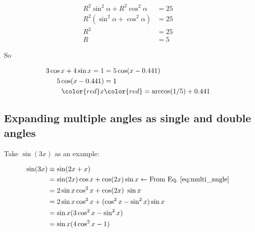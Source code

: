 \begin{equation*}
    \begin{aligned}
    R^2\sin^2\alpha + R^2\cos^2\alpha &= 25\\
    R^2(\sin^2\alpha + \cos^2\alpha) &= 25\\
    R^2 &= 25\\
    R &= 5
    \end{aligned}
\end{equation*}

\noindent{}So

\begin{equation*}
    \begin{aligned}
        3\cos x + 4\sin x = 1 &= 5\cos (x - 0.441)\\
        5\cos(x - 0.441) &= 1\\
        \color{red} x &\color{red}= \arccos (1/5) + 0.441
    \end{aligned}
\end{equation*}


\subsection{Expanding multiple angles as single and double angles}

Take $\sin (3x)$ as an example:

\begin{equation*}
    \begin{aligned}
        \sin(3x) &\equiv \sin(2x + x)\\
        &= \sin(2x)\cos x + \cos(2x) \sin x \leftarrow \text{From Eq.~\ref{eq:multi_angle}}\\
        &= 2\sin x \cos^2 x + \cos(2x) \ \sin x\\
        &= 2\sin x \cos^2 x + (\cos^2 x - \sin^2 x)\sin x\\
        &= \sin x (3\cos^2 x - \sin^2 x)\\
        &= \sin x (4\cos^2 x - 1)
    \end{aligned}
\end{equation*}
